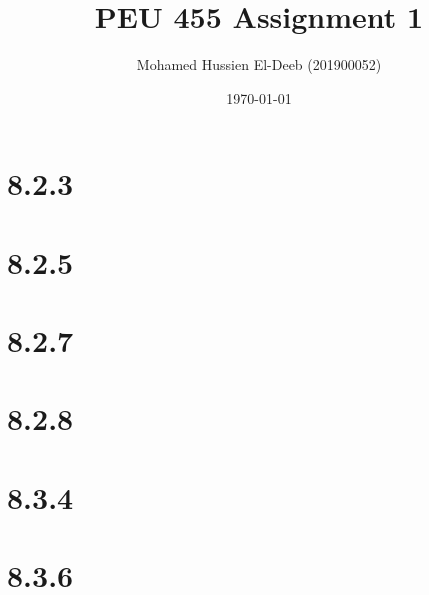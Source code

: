 \documentclass[12pt]{article}
\title{PEU 455 Assignment 1}
\author{Mohamed Hussien El-Deeb (201900052)}
\date{\today}
\begin{document}
\maketitle
\tableofcontents

\section{8.2.3}

\newpage
\section{8.2.5}

\newpage
\section{8.2.7}

\newpage
\section{8.2.8}

\newpage
\section{8.3.4}

\newpage
\section{8.3.6}

\newpage



\nocite{arfken2013mathematical}
\nocite{El-Deeb_PEU-455_Assignments}
\end{document}
